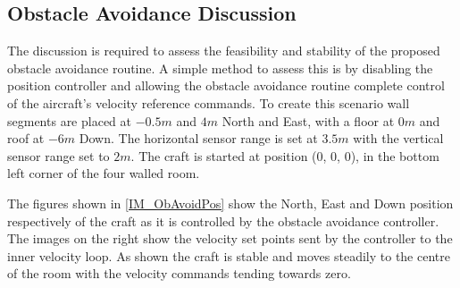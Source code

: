 				
		\subsection{Obstacle Avoidance Discussion}
		The discussion is required to assess the feasibility and stability of the proposed obstacle avoidance routine. A simple method to assess this is by disabling the position controller and allowing the obstacle avoidance routine complete control of the aircraft's velocity reference commands. To create this scenario wall segments are placed at $-0.5m$ and $4m$ North and East, with a floor at $0m$ and roof at $-6m$ Down. The horizontal sensor range is set at $3.5m$ with the vertical sensor range set to $2m$. The craft is started at position (0, 0, 0), in the bottom left corner of the four walled room.
		
		The figures shown in \ref{IM_ObAvoidPos} show the North, East and Down position respectively of the craft as it is controlled by the obstacle avoidance controller. The images on the right show the velocity set points sent by the controller to the inner velocity loop. As shown the craft is stable and moves steadily to the centre of the room with the velocity commands tending towards zero. 
		
